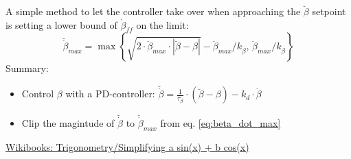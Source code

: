 \documentclass{article}
\begin{document}
A simple method to let the controller take over when approaching the $\breve{\beta}$ setpoint is setting a lower bound of $\dot{\beta}_{ff}$ on the limit:
\begin{equation}
\breve{\dot{\beta}}_{max} = \max{ \left\{ \sqrt{2 \cdot \ddot{\beta}_{max} \cdot |\breve{\beta} - \beta|} - \ddot{\beta}_{max} / k_{\dot{\beta}}, \, \ddot{\beta}_{max} / k_{\dot{\beta}} \right\} }
\label{eq:beta_dot_max}
\end{equation}
Summary:
\begin{itemize}
	\item{Control $\beta$ with a PD-controller: $\breve{\dot{\beta}} = \frac{1}{\tau_{\beta}} \cdot \left( \breve{\beta} - \beta \right) - k_d \cdot \dot{\beta}$ }
	\item{Clip the magintude of $\breve{\dot{\beta}}$ to $\breve{\dot{\beta}}_{max}$ from eq. \ref{eq:beta_dot_max}}
\end{itemize}

\begin{thebibliography}{1}

 \href{https://en.wikibooks.org/wiki/Trigonometry/Simplifying_a_sin(x)_+_b_cos(x)}{Wikibooks: Trigonometry/Simplifying a sin(x) + b cos(x)}

\end{thebibliography}
\end{document}
